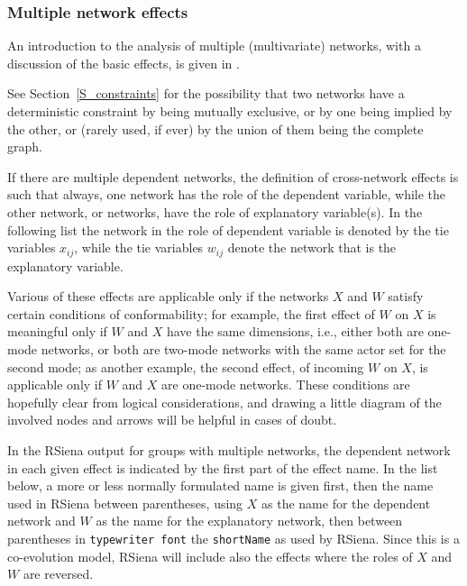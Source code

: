 \documentclass[a4paper,fleqn,11pt]{article}
\newcommand{\+}{\, + \,}
\newcommand{\rs}{{\sf RSiena}}
\newcommand{\RS}{{\sf \textsf{RSiena} }}
\begin{document}
\subsubsection{Multiple network effects}
\label{S_MultiNet}

An introduction to the analysis of multiple (multivariate) networks,
with a discussion of the basic effects, is given in \citet{SLT2013}.

See Section~\ref{S_constraints} for the possibility that two networks
have a deterministic constraint by being mutually exclusive,
or by one being implied by the other, or (rarely used, if ever)
by the union of them being the complete graph.

If there are multiple dependent networks, the definition of
cross-network effects is such that always, one network has the
role of the dependent variable, while the other network, or
networks, have the role of explanatory variable(s).
In the following list the network in the role of dependent variable
is denoted by the tie variables $x_{ij}$, while the
tie variables $w_{ij}$ denote the network that is the
explanatory variable.

Various of these effects are applicable only if the networks $X$
and $W$ satisfy certain conditions of conformability; for example,
the first effect of $W$ on $X$ is meaningful only if $W$ and $X$
have the same dimensions, i.e., either both are one-mode networks,
or both are two-mode networks with the same actor set for the second mode;
as another example, the second effect, of incoming $W$ on $X$,
is applicable only if $W$ and $X$ are one-mode networks.
These conditions are hopefully clear from logical considerations,
and drawing a little diagram of the involved nodes and arrows
will be helpful in cases of doubt.

In the \RS output for groups with multiple networks,
the dependent network in each given effect is indicated by
the first part of the effect name.
In the list below, a more or less normally formulated name is given first,
then the name used in \RS between parentheses,
using $X$ as the name for the dependent network and $W$
as the name for the explanatory network,
then between parentheses in \texttt{typewriter font} the \texttt{shortName}
as used by \rs.
Since this is a co-evolution model, \RS will include also the effects
where the roles of $X$ and $W$ are reversed.
\end{document}
